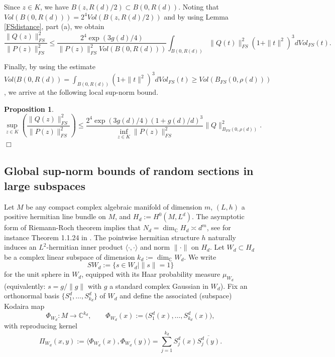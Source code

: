 \documentclass [11pt]{amsart}
\newtheorem {proposition}[theorem]{Proposition}
\theoremstyle{remark}
\numberwithin{equation}{section}
\numberwithin{theorem}{section}
\begin{document}
\noindent Since $z\in K$, we have $\displaystyle{B\left(z,R(d)/2\right)\subset B(0,R(d))}$. Noting that $\displaystyle{Vol(B(0,R(d)))=2^4 Vol\left(B\left(z,R(d)/2\right)\right)}$ and by using Lemma \ref{FSdistance}, part (a), we obtain
\[ \frac{\|Q(z)\|^2_{FS}}{\|P(z)\|^2_{FS}} \leq \frac{2^4  \exp\left(3g(d)/4\right)}{\|P(z)\|^2_{FS} Vol(B(0,R(d)))} \int_{B(0,R(d))} \|Q(t)\|^2_{FS}(1+\|t\|^2)^3 dVol_{FS}(t). \] 

\noindent Finally, by using the estimate $\displaystyle{ Vol(B(0,R(d))= \int_{B(0,R(d))} (1+\|t\|^2)^3 dVol_{FS}(t) \geq Vol(B_{FS}(0, \rho(d)))}$, we arrive at the following local sup-norm bound. 

\begin{proposition} \label{localsupbound}
\begin{equation}
 \sup_{z\in K} \left( \frac{\|Q(z)\|^2_{FS} }{\|P(z)\|^2_{FS}} \right) \leq  \frac{2^4  \exp\left(3g(d)/4\right) \left(1+g(d)/d\right)^3 }{\inf_{z\in K}  \|P(z)\|^2_{FS} }  \|Q\|^2_{B_{FS}(0,\rho(d))}.  
\end{equation} 
\hfill $\Box$
\end{proposition}


\subsection{Global sup-norm bounds of random sections in large subspaces}
Let $M$ be any compact complex algebraic manifold of dimension $m$,  $(L,h)$ a positive hermitian line bundle on $M$, and $H_{d}:=H^{0}(M,L^{d})$. The asymptotic form of Riemann-Roch theorem implies that $N_{d}= \dim_{\mathbb{C}}H_{d}\asymp d^{m}$, see for instance Theorem 1.1.24 in \cite{Laz}. The pointwise hermitian structure $h$ naturally induces an $L^2$-hermitian inner product $\langle \cdot,\cdot \rangle$ and norm $\|\cdot\|$ on $H_{d}$. Let
$W_d \subset H_d$ be a complex linear subspace of dimension $k_d := \dim_{\mathbb{C}} W_d.$
We write
\[
SW_d:=\{s\in W_d | \|s\|=1\}
\]
for the unit sphere in $W_d$, equipped with its Haar probability measure $\mu_{W_d}$
(equivalently: $\displaystyle{s=g/\|g\|}$ with $g$ a standard complex Gaussian in $W_d$). Fix an orthonormal basis $\{S_1^d,\dots,S_{k_d}^d\}$ of $W_d$ and define the associated
(subspace) Kodaira map
\[
\Phi_{W_d}:M\to\mathbb{C}^{k_d},
\qquad
\Phi_{W_d}(x):=\big(S_1^d(x),\dots,S_{k_d}^d(x)\big),
\]
with reproducing kernel
\[ \Pi_{W_d}(x,y)
:=\langle \Phi_{W_d}(x), \Phi_{W_d}(y)\rangle 
=\sum_{j=1}^{k_d} S_j^d(x)\overline{S_j^d(y)} .
\]

\end{document}
